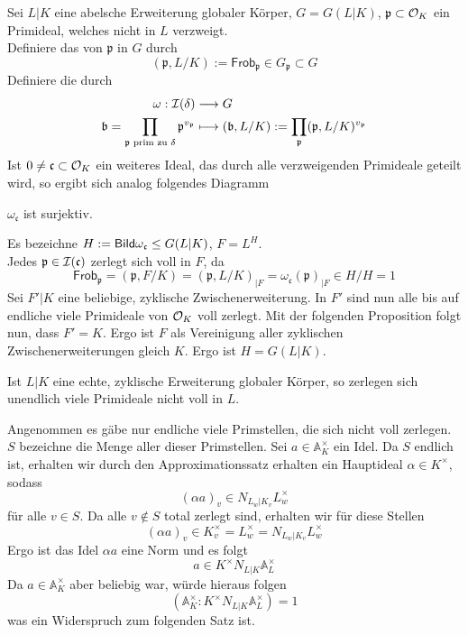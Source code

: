 \documentclass{book}
\renewcommand{\A}{\mathbb{A}}
\renewcommand{\bf}{\mathfrak{b}}
\newcommand{\cf}{\mathfrak{c}}
\newcommand{\pf}{\mathfrak{p}}
\newcommand{\Frob}{\textsf{Frob}}
\begin{document}
Sei $L|K$ eine abelsche Erweiterung globaler Körper, $G = G(L|K)$, $\pf \subset \O_K$ ein Primideal, welches nicht in $L$ verzweigt.\\
Definiere das  von $\pf$ in $G$ durch
\[ (\pf, L/K) := \Frob_\pf \in G_\pf \subset G \]
Definiere die  durch
\begin{align*}
\omega : \I(\delta) & \Pfeil{} G\\
\bf = \prod_{\pf \text{ prim zu }\delta} \pf^{v_{\pf}} & \longmapsto (\bf,L/K) := \prod_{\pf} (\pf, L/K)^{v_\pf}
\end{align*}
Ist $0\neq \cf \subset \O_K$ ein weiteres Ideal, das durch alle verzweigenden Primideale geteilt wird, so ergibt sich analog folgendes Diagramm
\begin{center}
\end{center}

\Satz{}
$\omega_\cf$ ist surjektiv.
\begin{Beweis}{}
Es bezeichne $H := \Img \omega_\cf \leq G(L|K)$, $F = L^H$.\\
Jedes $\pf \in \I(\cf)$ zerlegt sich voll in $F$, da
\[ \Frob_\pf =  (\pf, F/K) =(\pf, L/K)_{|F} = \omega_\cf(\pf)_{|F} \in H/H = 1 \]
Sei $F'|K$ eine beliebige, zyklische Zwischenerweiterung. In $F'$ sind nun alle bis auf endliche viele Primideale von $\mathcal{O}_K$ voll zerlegt. Mit der folgenden Proposition folgt nun, dass $F' = K$. Ergo ist $F$ als Vereinigung aller zyklischen Zwischenerweiterungen gleich $K$. Ergo ist $H = G(L|K)$.
\end{Beweis}

\Prop{}
Ist $L|K$ eine echte, zyklische Erweiterung globaler Körper, so zerlegen sich unendlich viele Primideale nicht voll in $L$.

\begin{Beweis}{}
Angenommen es gäbe nur endliche viele Primstellen, die sich nicht voll zerlegen. $S$ bezeichne die Menge aller dieser Primstellen. Sei $a \in \A_K^\times$ ein Idel. Da $S$ endlich ist, erhalten wir durch den Approximationssatz erhalten ein Hauptideal $\alpha \in K^\times$, sodass
\[ (\alpha a)_v \in N_{L_w|K_v}L_w^\times\]
für alle $v \in S$. Da alle $v\notin S$ total zerlegt sind, erhalten wir für diese Stellen
\[ (\alpha a)_v \in K_v^\times = L_w^\times = N_{L_w|K_v}L_w^\times \]
Ergo ist das Idel $\alpha a$ eine Norm und es folgt
\[ a \in K^\times N_{L|K}\A_L^\times \]
Da $a \in \A_K^\times$ aber beliebig war, würde hieraus folgen
\[ (\A_K^\times :K^\times N_{L|K} \A_L^\times  ) = 1\]
was ein Widerspruch zum folgenden Satz ist.  
\end{Beweis}
\end{document}
